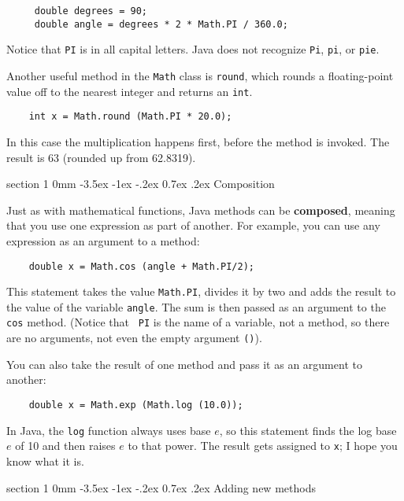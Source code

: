 \documentclass{book}
\makeatletter
\renewcommand{\section}{\@startsection 
    {section} {1} {0mm}%
    {-3.5ex \@plus -1ex \@minus -.2ex}%
    {0.7ex \@plus.2ex}%
    {\normalfont\Large\bfseries}}
\makeatother
\begin{document}
\begin{verbatim}
     double degrees = 90;
     double angle = degrees * 2 * Math.PI / 360.0;
\end{verbatim}
%
Notice that {\tt PI} is in all capital letters.  Java does
not recognize {\tt Pi}, {\tt pi}, or {\tt pie}.

Another useful method in the {\tt Math} class is {\tt round},
which rounds a floating-point value off to the nearest integer
and returns an {\tt int}.

\begin{verbatim}
    int x = Math.round (Math.PI * 20.0);
\end{verbatim}
%
In this case the multiplication happens first, before the
method is invoked.  The result is 63 (rounded up from 62.8319).


\section {Composition}
\label{composition}

Just as with mathematical functions, Java methods can be {\bf
composed}, meaning that you use one expression as part of another.
For example, you can use any expression as an argument to a method:

\begin{verbatim}
    double x = Math.cos (angle + Math.PI/2);
\end{verbatim}
%
This statement takes the value {\tt Math.PI}, divides it by two and
adds the result to the value of the variable {\tt angle}.  The sum is
then passed as an argument to the {\tt cos} method.  (Notice that {\tt
PI} is the name of a variable, not a method, so there are no
arguments, not even the empty argument {\tt ()}).

You can also take the result of one method and pass it as
an argument to another:

\begin{verbatim}
    double x = Math.exp (Math.log (10.0));
\end{verbatim}
%
In Java, the {\tt log} function always uses base $e$, so this
statement finds the log base $e$ of 10 and then raises $e$ to that
power.  The result gets assigned to {\tt x}; I hope you know what it
is.

\section{Adding new methods}
\end{document}
